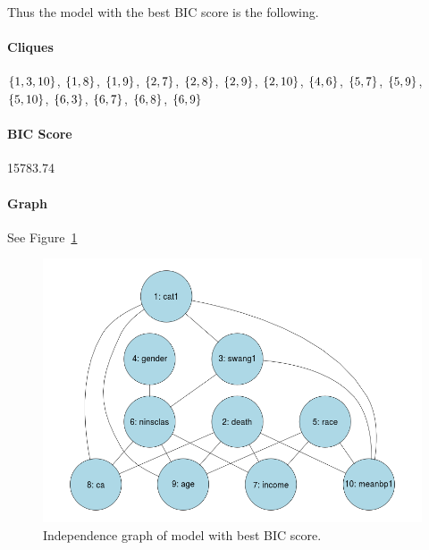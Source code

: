 \documentclass[12pt]{article}
\theoremstyle{definition}
\begin{document}
Thus the model with the best BIC score is the following.
\paragraph{Cliques}
$\set{1,3,10}$, $\set{1,8}$, $\set{1,9}$, $\set{2,7}$, $\set{2,8}$, $\set{2,9}$,
$\set{2,10}$, $\set{4,6}$, $\set{5,7}$, $\set{5,9}$, $\set{5,10}$, $\set{6,3}$,
$\set{6,7}$, $\set{6,8}$, $\set{6,9}$

\paragraph{BIC Score} 15783.74

\paragraph{Graph} See Figure~\ref{fig:best}

\begin{figure}[H]
    \centering
    \includegraphics[width=0.8\linewidth]{best.png}
    \caption{Independence graph of model with best BIC score.}
\label{fig:best}
\end{figure}
\end{document}
